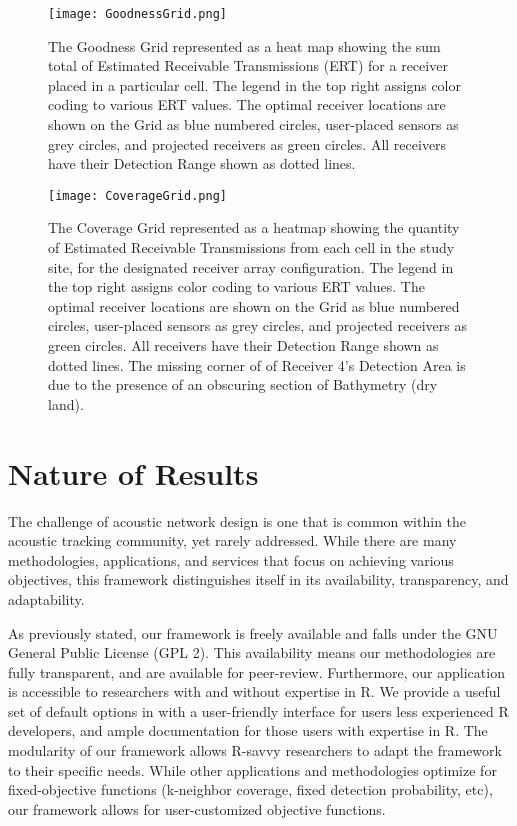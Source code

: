 \begin{figure}[ht]
	\texttt{[image: GoodnessGrid.png]}
	\caption{The Goodness Grid represented as a heat map showing the sum total of Estimated Receivable Transmissions (ERT) for a receiver placed in a particular cell.  The legend in the top right assigns color coding to various ERT values. The optimal receiver locations are shown on the Grid as blue numbered circles, user-placed sensors as grey circles, and projected receivers as green circles.  All receivers have their Detection Range shown as dotted lines.\label{GoodnessGraph}} 
\end{figure}

\begin{figure}[ht]
	\texttt{[image: CoverageGrid.png]}
	\caption{The Coverage Grid represented as a heatmap showing the quantity of Estimated Receivable Transmissions from each cell in the study site, for the designated receiver array configuration.  The legend in the top right assigns color coding to various ERT values.  The optimal receiver locations are shown on the Grid as blue numbered circles, user-placed sensors as grey circles, and projected receivers as green circles.  All receivers have their Detection Range shown as dotted lines.  The missing corner of of Receiver 4's Detection Area is due to the presence of an obscuring section of Bathymetry (dry land).\label{coverageGraph}}
\end{figure}

\section{Nature of Results}
The challenge of acoustic network design is one that is common within the acoustic tracking community, yet rarely addressed.  While there are many methodologies, applications, and services that focus on achieving various objectives, this framework distinguishes itself in its availability, transparency, and adaptability.  

As previously stated, our framework is freely available \cite{acousitcdeploy} and falls under the GNU General Public License (GPL 2).  This availability means our methodologies are fully transparent, and are available for peer-review.  Furthermore, our application is accessible to researchers with and without expertise in R.  We provide a useful set of default options in with a user-friendly interface for users less experienced R developers, and ample documentation for those users with expertise in R.  The modularity of our framework allows R-savvy researchers to adapt the framework to their specific needs.  While other applications and methodologies optimize for fixed-objective functions (k-neighbor coverage, fixed detection probability, etc), our framework allows for user-customized objective functions.

